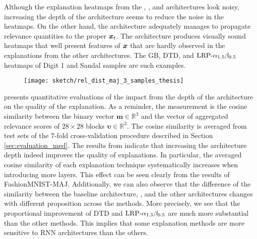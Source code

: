Although the explanation heatmaps from the , , and  architectures look noisy, increasing the depth of the architecture seems to reduce the noise in the heatmaps.   On the other hand, the  architecture adequately manages to propagate relevance quantities to the proper $\boldsymbol{x}_t$. The architecture produces visually sound heatmaps that well present features of $\boldsymbol{x}$ that are hardly observed in the explanations from the other architectures.  The GB, DTD, and $\text{LRP-}\alpha_{1.5}\beta_{0.5}$ heatmaps of Digit 1 and Sandal samples are such examples.

 \begin{figure}[!hbt]
\centering
\texttt{[image: sketch/rel\_dist\_maj\_3\_samples\_thesis]}



\label{fig:rel_dist_maj_3_samples_thesis}
\end{figure}

\addfigure{\ref{fig:rel_dist_maj_3_samples_thesis}} presents quantitative evaluations of the impact from the depth of the architecture on the quality of the explanation. As a reminder, the measurement is the cosine similarity between the binary vector $\boldsymbol{m} \in \mathbb{R}^3$ and the vector of aggregated relevance scores of $28\times28$ blocks $\boldsymbol{\upsilon} \in \mathbb{R}^3$. The cosine similarity is averaged from test sets of the $7$-fold cross-validation procedure described in Section \ref{sec:evaluation_med}. The results from \addfigure{\ref{fig:rel_dist_maj_3_samples_thesis}} indicate that increasing the architecture depth indeed improves the quality of explanations. In particular, the averaged cosine similarity of each explanation technique systematically increases when introducing  more layers. This effect can be seen clearly from the results of FashionMNIST-MAJ. Additionally, we can also observe that the difference of the similarity between the baseline architecture, , and the other  architectures changes with different proposition across the methods. More precisely, we see that the proportional improvement of  DTD and $\text{LRP-}\alpha_{1.5}\beta_{0.5}$ are much more substantial than the other methods. This implies that some explanation methods are more sensitive to RNN architectures than the others.


